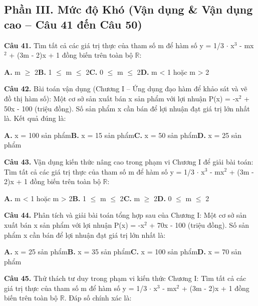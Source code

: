 \documentclass[11pt,a4paper]{article}
\begin{document}
\subsection*{\color{accent} Phần III. Mức độ Khó (Vận dụng \& Vận dụng cao -- Câu 41 đến Câu 50)}
\textbf{\color{primary} Câu 41.} Tìm tất cả các giá trị thực của tham số m để hàm số y = 1/3 $\cdot$ x$^3$ - mx$^2$ + (3m - 2)x + 1 đồng biến trên toàn bộ $\mathbb{R}$:\par
\hspace*{1.5em}\textbf{A.} m $\ge$ 2\quad\quad \textbf{B.} 1 $\le$ m $\le$ 2\quad\quad \textbf{C.} 0 $\le$ m $\le$ 2\quad\quad \textbf{D.} m < 1 hoặc m > 2\par\vspace{2pt}
\textbf{\color{primary} Câu 42.} Bài toán vận dụng (Chương I – Ứng dụng đạo hàm để khảo sát và vẽ đồ thị hàm số): Một cơ sở sản xuất bán x sản phẩm với lợi nhuận P(x) = -x$^2$ + 50x - 100 (triệu đồng). Số sản phẩm x cần bán để lợi nhuận đạt giá trị lớn nhất là. Kết quả đúng là:\par
\hspace*{1.5em}\textbf{A.} x = 100 sản phẩm\quad\quad \textbf{B.} x = 15 sản phẩm\quad\quad \textbf{C.} x = 50 sản phẩm\quad\quad \textbf{D.} x = 25 sản phẩm\par\vspace{2pt}
\textbf{\color{primary} Câu 43.} Vận dụng kiến thức nâng cao trong phạm vi Chương I để giải bài toán: Tìm tất cả các giá trị thực của tham số m để hàm số y = 1/3 $\cdot$ x$^3$ - mx$^2$ + (3m - 2)x + 1 đồng biến trên toàn bộ $\mathbb{R}$:\par
\hspace*{1.5em}\textbf{A.} m < 1 hoặc m > 2\quad\quad \textbf{B.} 1 $\le$ m $\le$ 2\quad\quad \textbf{C.} m $\ge$ 2\quad\quad \textbf{D.} 0 $\le$ m $\le$ 2\par\vspace{2pt}
\textbf{\color{primary} Câu 44.} Phân tích và giải bài toán tổng hợp sau của Chương I: Một cơ sở sản xuất bán x sản phẩm với lợi nhuận P(x) = -x$^2$ + 70x - 100 (triệu đồng). Số sản phẩm x cần bán để lợi nhuận đạt giá trị lớn nhất là:\par
\hspace*{1.5em}\textbf{A.} x = 25 sản phẩm\quad\quad \textbf{B.} x = 35 sản phẩm\quad\quad \textbf{C.} x = 100 sản phẩm\quad\quad \textbf{D.} x = 70 sản phẩm\par\vspace{2pt}
\textbf{\color{primary} Câu 45.} Thử thách tư duy trong phạm vi kiến thức Chương I: Tìm tất cả các giá trị thực của tham số m để hàm số y = 1/3 $\cdot$ x$^3$ - mx$^2$ + (3m - 2)x + 1 đồng biến trên toàn bộ $\mathbb{R}$. Đáp số chính xác là:\par
\end{document}
